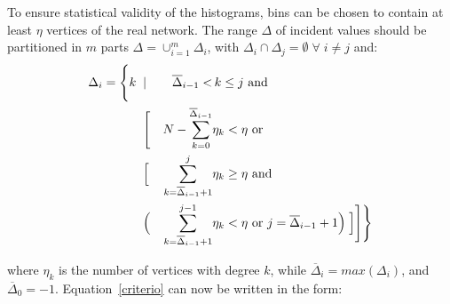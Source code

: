 \documentclass[%
	aip,
	jmp,%
	amsmath,amssymb,
	reprint,%
]{revtex4-1}
\begin{document}
																																																																																To ensure statistical validity of the histograms, bins can be chosen to contain at least $\eta$ vertices of the real network.
																																																																																The range $\Delta$ of incident values should be partitioned in $m$ parts $\Delta=\cup_{i=1}^m \Delta_i$,
																																																																																with $\Delta_i\cap \Delta_j=\emptyset \; \forall\; i \neq j$ and:
																																																																																\begin{align}
																																																																																	\Delta_i =\Biggl\{ k\;\; & | & \overline{\Delta}_{i-1}< &\, k\leq j \text{ and }\;\;\;\;\;\;\;\;\;\;\;\;\nonumber\\
																																																																																							     & \Biggl[ & N - \sum_{k=0}^{\overline{\Delta}_{i-1}} & \eta_k< \eta \text{ or }\\
																																																																																					&	\Bigl[ & \sum_{k=\overline{\Delta}_{i-1}+1}^j &  \eta_k \geq \eta \text{ and }\;\;\;\;\;\;\nonumber\\
																																																																																				 & \Bigl( &\sum_{k=\overline{\Delta}_{i-1}+1}^{j-1} &  \eta_k < \eta \text{ or }   j=\overline{\Delta}_{i-1}+1 \Bigr) \;\Bigr] \Biggr] \Biggr\}\nonumber
																																																																																\end{align}

																																																																																\noindent where $\eta_k$ is the number of vertices with degree $k$, while $\overline{\Delta}_{i}=max(\Delta_{i})$, and $\overline{\Delta}_{0}=-1$. Equation~\ref{criterio} can now be written in the form:
\end{document}
